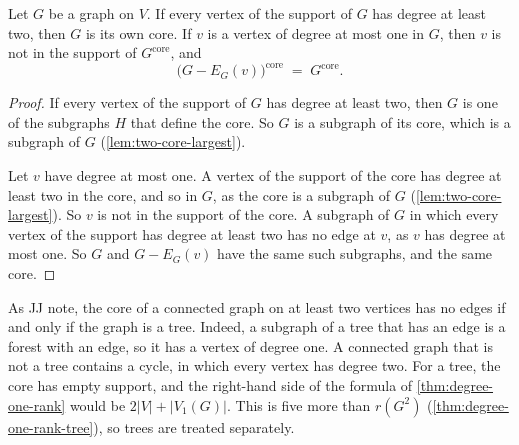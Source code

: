 \begin{lemma}
  \label{lem:two-core-degree-one}
  \leanok
  Let $G$ be a graph on $V$. If every vertex of the support of $G$ has
  degree at least two, then $G$ is its own core. If $v$ is a vertex of
  degree at most one in $G$, then $v$ is not in the support of
  $G^{\mathrm{core}}$, and
  \[
    \bigl(G - E_G(v)\bigr)^{\mathrm{core}} \;=\; G^{\mathrm{core}} .
  \]
\end{lemma}
\begin{proof}
  \leanok
  If every vertex of the support of $G$ has degree at least two, then
  $G$ is one of the subgraphs $H$ that define the core. So $G$ is a
  subgraph of its core, which is a subgraph of $G$
  (\cref{lem:two-core-largest}).

  Let $v$ have degree at most one. A vertex of the support of the core
  has degree at least two in the core, and so in $G$, as the core is a
  subgraph of $G$ (\cref{lem:two-core-largest}). So $v$ is not in the
  support of the core. A subgraph of $G$ in which every vertex of the
  support has degree at least two has no edge at $v$, as $v$ has degree
  at most one. So $G$ and $G - E_G(v)$ have the same such subgraphs, and
  the same core.
\end{proof}

As JJ note, the core of a connected graph on at least two vertices has
no edges if and only if the graph is a tree. Indeed, a subgraph of a
tree that has an edge is a forest with an edge, so it has a vertex of
degree one. A connected graph that is not a tree contains a cycle, in
which every vertex has degree two. For a tree, the core has empty
support, and the right-hand side of the formula of
\cref{thm:degree-one-rank} would be $2|V| + |V_1(G)|$. This is five more
than $r(G^2)$ (\cref{thm:degree-one-rank-tree}), so trees are treated
separately.

